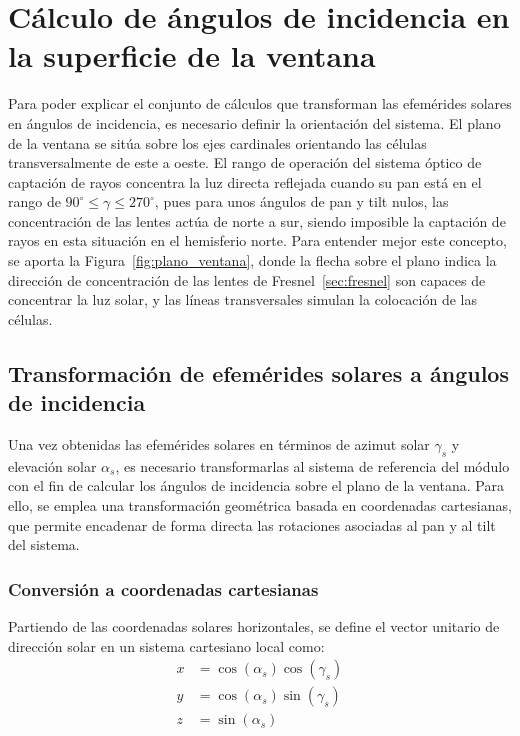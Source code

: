 \section{Cálculo de ángulos de incidencia en la superficie de la ventana}

Para poder explicar el conjunto de cálculos que transforman las efemérides solares en ángulos de incidencia, es necesario definir la orientación del sistema. El plano de la ventana se sitúa sobre los ejes cardinales orientando las células transversalmente de este a oeste. El rango de operación del sistema óptico de captación de rayos concentra la luz directa reflejada cuando su pan está en el rango de \( 90^\circ \leq \gamma \leq 270^\circ \), pues para unos ángulos de pan y tilt nulos, las concentración de las lentes actúa de norte a sur, siendo imposible la captación de rayos en esta situación en el hemisferio norte. Para entender mejor este concepto, se aporta la Figura~\ref{fig:plano_ventana}, donde la flecha sobre el plano indica la dirección de concentración de las lentes de Fresnel~\ref{sec:fresnel} son capaces de concentrar la luz solar, y las líneas transversales simulan la colocación de las células.


\subsection{Transformación de efemérides solares a ángulos de incidencia}

Una vez obtenidas las efemérides solares en términos de azimut solar $\gamma_s$ y elevación solar $\alpha_s$, es necesario transformarlas al sistema de referencia del módulo con el fin de calcular los ángulos de incidencia sobre el plano de la ventana. Para ello, se emplea una transformación geométrica basada en coordenadas cartesianas, que permite encadenar de forma directa las rotaciones asociadas al pan y al tilt del sistema.

\subsubsection{Conversión a coordenadas cartesianas}

Partiendo de las coordenadas solares horizontales, se define el vector unitario de dirección solar en un sistema cartesiano local como:
\begin{equation}
	\begin{aligned}
		x &= \cos(\alpha_s)\cos(\gamma_s) \\
		y &= \cos(\alpha_s)\sin(\gamma_s) \\
		z &= \sin(\alpha_s)
	\end{aligned}
\end{equation}

